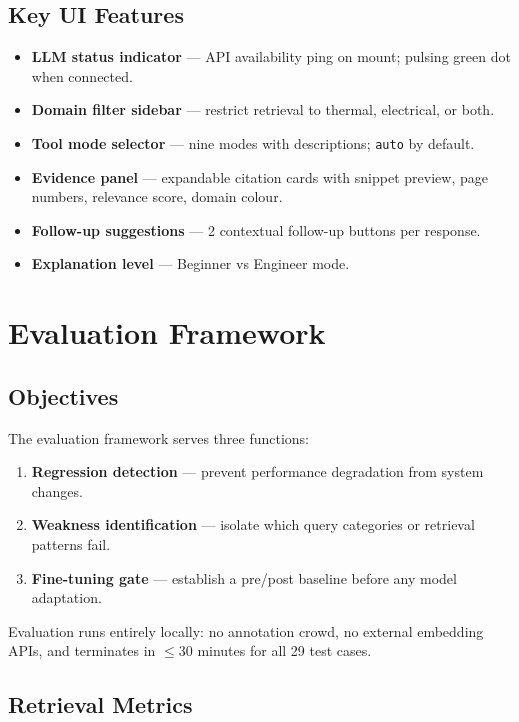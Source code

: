 \documentclass[12pt,a4paper]{report}
\begin{document}
\section{Key UI Features}

\begin{itemize}
  \item \textbf{LLM status indicator} --- API availability ping on mount; pulsing green dot when connected.
  \item \textbf{Domain filter sidebar} --- restrict retrieval to thermal, electrical, or both.
  \item \textbf{Tool mode selector} --- nine modes with descriptions; \texttt{auto} by default.
  \item \textbf{Evidence panel} --- expandable citation cards with snippet preview, page numbers, relevance score, domain colour.
  \item \textbf{Follow-up suggestions} --- 2 contextual follow-up buttons per response.
  \item \textbf{Explanation level} --- Beginner vs Engineer mode.
\end{itemize}

\chapter{Evaluation Framework}

\section{Objectives}

The evaluation framework serves three functions:
\begin{enumerate}
  \item \textbf{Regression detection} --- prevent performance degradation from system changes.
  \item \textbf{Weakness identification} --- isolate which query categories or retrieval patterns fail.
  \item \textbf{Fine-tuning gate} --- establish a pre/post baseline before any model adaptation.
\end{enumerate}

Evaluation runs entirely locally: no annotation crowd, no external embedding APIs, and terminates in $\leq 30$ minutes for all 29 test cases.

\section{Retrieval Metrics}
\end{document}
